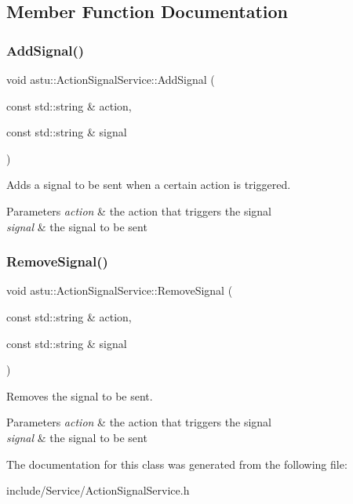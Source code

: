 \subsection{Member Function Documentation}
\mbox{\label{classastu_1_1ActionSignalService_a21b2cca24b3835063b4bf1d59157ab80}} 
\subsubsection{\texorpdfstring{Add\+Signal()}{AddSignal()}}
{\footnotesize\ttfamily void astu\+::\+Action\+Signal\+Service\+::\+Add\+Signal (\begin{DoxyParamCaption}\item[{const std\+::string \&}]{action,  }\item[{const std\+::string \&}]{signal }\end{DoxyParamCaption})}

Adds a signal to be sent when a certain action is triggered.


\begin{DoxyParams}{Parameters}
{\em action} & the action that triggers the signal \\
\hline
{\em signal} & the signal to be sent \\
\hline
\end{DoxyParams}
\mbox{\label{classastu_1_1ActionSignalService_ae9e72c9808b02e9dbdb6ad164a535514}} 
\subsubsection{\texorpdfstring{Remove\+Signal()}{RemoveSignal()}}
{\footnotesize\ttfamily void astu\+::\+Action\+Signal\+Service\+::\+Remove\+Signal (\begin{DoxyParamCaption}\item[{const std\+::string \&}]{action,  }\item[{const std\+::string \&}]{signal }\end{DoxyParamCaption})}

Removes the signal to be sent. 
\begin{DoxyParams}{Parameters}
{\em action} & the action that triggers the signal \\
\hline
{\em signal} & the signal to be sent \\
\hline
\end{DoxyParams}


The documentation for this class was generated from the following file\+:\begin{DoxyCompactItemize}
\item 
include/\+Service/Action\+Signal\+Service.\+h\end{DoxyCompactItemize}
